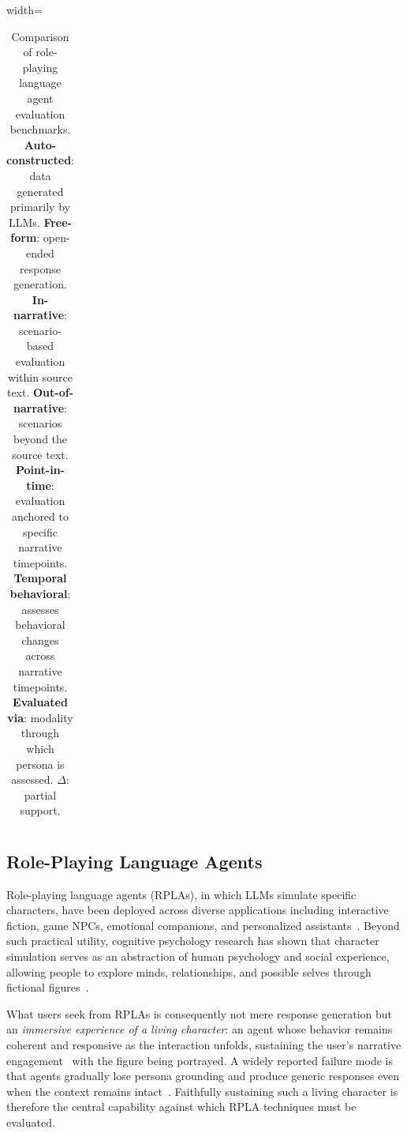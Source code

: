 \documentclass[11pt]{article}
\begin{document}
{\begin{table}[t!]
\begin{adjustbox}{width=\textwidth}
\begin{tabular}{lcccccccl}
\end{tabular}
\end{adjustbox}
\caption{
Comparison of role-playing language agent evaluation benchmarks.
\textbf{Auto-constructed}: data generated primarily by LLMs.
\textbf{Free-form}: open-ended response generation.
\textbf{In-narrative}: scenario-based evaluation within source text.
\textbf{Out-of-narrative}: scenarios beyond the source text.
\textbf{Point-in-time}: evaluation anchored to specific narrative timepoints.
\textbf{Temporal behavioral}: assesses behavioral changes across narrative timepoints.
\textbf{Evaluated via}: modality through which persona is assessed.
$\Delta$: partial support.
}
\label{tab:benchmark_comparison}
\end{table}
}



\subsection{Role-Playing Language Agents\label{sec:character_psychology}}

Role-playing language agents (RPLAs), in which LLMs simulate specific characters, have been deployed across diverse applications including interactive fiction, game NPCs, emotional companions, and personalized assistants~\cite{chen2024personatoper, wang-etal-2024-rolellm, gao-etal-2023-livechat, Xu_2022_COSPLAY, shanahan2023roleplaylargelanguagemodels, chen2025oscarsaitheatersurvey}. Beyond such practical utility, cognitive psychology research has shown that character simulation serves as an abstraction of human psychology and social experience, allowing people to explore minds, relationships, and possible selves through fictional figures~\cite{functionoffiction, OATLEY2016618fictionsocialworlds}.

What users seek from RPLAs is consequently not mere response generation but an \emph{immersive experience of a living character}: an agent whose behavior remains coherent and responsive as the interaction unfolds, sustaining the user's narrative engagement~\cite{green2000, Ryan:2003:Book, Ryan:2008:ICIDS, Busselle23112009} with the figure being portrayed. A widely reported failure mode is that agents gradually lose persona grounding and produce generic responses even when the context remains intact~\cite{shin-etal-2025-spotting, luz-de-araujo-etal-2026-persistent}. Faithfully sustaining such a living character is therefore the central capability against which RPLA techniques must be evaluated.
\end{document}
